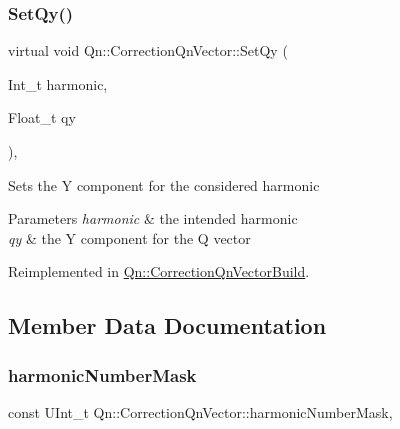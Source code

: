 \mbox{\label{classQn_1_1CorrectionQnVector_af0ac581e943fe88b0a94838c670f2c4d}} 
\subsubsection{\texorpdfstring{Set\+Qy()}{SetQy()}}
{\footnotesize\ttfamily virtual void Qn\+::\+Correction\+Qn\+Vector\+::\+Set\+Qy (\begin{DoxyParamCaption}\item[{Int\+\_\+t}]{harmonic,  }\item[{Float\+\_\+t}]{qy }\end{DoxyParamCaption})\hspace{0.3cm}{\ttfamily [inline]}, {\ttfamily [virtual]}}

Sets the Y component for the considered harmonic 
\begin{DoxyParams}{Parameters}
{\em harmonic} & the intended harmonic \\
\hline
{\em qy} & the Y component for the Q vector \\
\hline
\end{DoxyParams}


Reimplemented in \mbox{\hyperlink{classQn_1_1CorrectionQnVectorBuild_a1b9a7e2b0eafc48de05a2f90fcc51fb6}{Qn\+::\+Correction\+Qn\+Vector\+Build}}.



\subsection{Member Data Documentation}
\mbox{\label{classQn_1_1CorrectionQnVector_a4dd6b60f412516d586b204f63350ab5d}} 
\subsubsection{\texorpdfstring{harmonic\+Number\+Mask}{harmonicNumberMask}}
{\footnotesize\ttfamily const U\+Int\+\_\+t Qn\+::\+Correction\+Qn\+Vector\+::harmonic\+Number\+Mask\hspace{0.3cm}{\ttfamily [static]}, {\ttfamily [protected]}}

